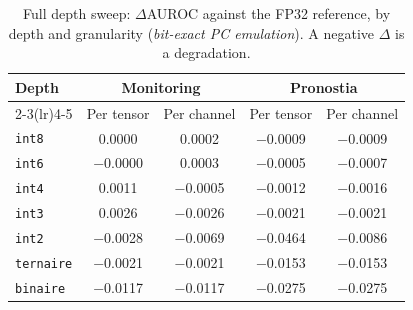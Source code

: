 \begin{table}[htbp]
\centering
\caption{Full depth sweep: $\Delta$AUROC against the FP32 reference, by depth and granularity (\emph{bit-exact PC emulation}). A negative $\Delta$ is a degradation.}
\label{tab:annex-depth}
\begin{tabular}{lcccc}
\toprule
Depth & \multicolumn{2}{c}{Monitoring} & \multicolumn{2}{c}{Pronostia} \\
\cmidrule(lr){2-3}\cmidrule(lr){4-5}
 & Per tensor & Per channel & Per tensor & Per channel \\
\midrule
\texttt{int8} & \num{0.0000} & \num{0.0002} & \num{-0.0009} & \num{-0.0009} \\
\texttt{int6} & \num{-0.0000} & \num{0.0003} & \num{-0.0005} & \num{-0.0007} \\
\texttt{int4} & \num{0.0011} & \num{-0.0005} & \num{-0.0012} & \num{-0.0016} \\
\texttt{int3} & \num{0.0026} & \num{-0.0026} & \num{-0.0021} & \num{-0.0021} \\
\texttt{int2} & \num{-0.0028} & \num{-0.0069} & \num{-0.0464} & \num{-0.0086} \\
\texttt{ternaire} & \num{-0.0021} & \num{-0.0021} & \num{-0.0153} & \num{-0.0153} \\
\texttt{binaire} & \num{-0.0117} & \num{-0.0117} & \num{-0.0275} & \num{-0.0275} \\
\bottomrule
\end{tabular}
\end{table}
